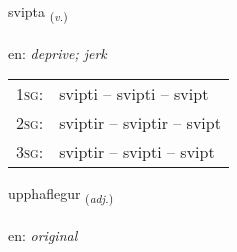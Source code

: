\documentclass[frontgrid, backgrid]{flacards}\usepackage[]{graphicx}\usepackage[]{xcolor}
\begin{document}
\renewcommand{\flhead}{\vskip5pt \fboxsep=0pt {\small\bfseries\footnotesize Sagnorð | Verb}}
\renewcommand{\fcfoot}{\vskip5pt \fboxsep=0pt \hspace{2pt}{\small\bfseries\footnotesize 3K}}

\renewcommand{\blhead}{\vskip5pt {\small\bfseries\footnotesize Sagnorð | Verb }}
\renewcommand{\bcfoot}{\vskip5pt \hspace{2pt}{\small\bfseries\footnotesize 3K}}


{svipta \small{\textsubscript{(\textit{v.})}} \\[1ex] %
\textphonetic{[svɪfta]} \\
en: \emph{deprive; jerk} \\  [2ex]
\renewcommand*{\arraystretch}{0.8}
\begin{tabular}{p{1cm}l}
\textsc{1sg}: & svipti -- svipti -- svipt \\ 
\textsc{2sg}: & sviptir -- sviptir -- svipt \\ 
\textsc{3sg}: & sviptir -- svipti -- svipt \\ 
\end{tabular}
}

\renewcommand{\flhead}{\vskip5pt \fboxsep=0pt {\small\bfseries\footnotesize Lýsingarorð | Adjective}}
\renewcommand{\fcfoot}{\vskip5pt \fboxsep=0pt \hspace{2pt}{\small\bfseries\footnotesize 3K}}

\renewcommand{\blhead}{\vskip5pt {\small\bfseries\footnotesize Lýsingarorð | Adjective }}
\renewcommand{\bcfoot}{\vskip5pt \hspace{2pt}{\small\bfseries\footnotesize 3K}}


{upphaflegur \small{\textsubscript{(\textit{adj.})}} \\[1ex] %
\textphonetic{[ʏhphavlɛɣʏr]} \\
en: \emph{original} \\  [2ex]
\renewcommand*{\arraystretch}{0.8}
}
\end{document}
